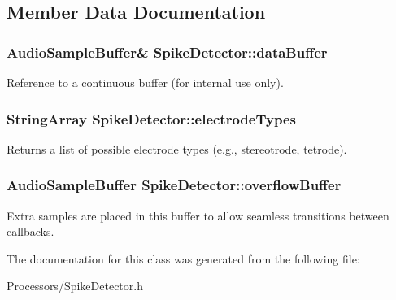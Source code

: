 \subsection{Member Data Documentation}
\hypertarget{classSpikeDetector_a050b87d647b7d12dd76e6e4fde9f932f}{
\subsubsection[{data\-Buffer}]{\setlength{\rightskip}{0pt plus 5cm}Audio\-Sample\-Buffer\& Spike\-Detector\-::data\-Buffer}}\label{classSpikeDetector_a050b87d647b7d12dd76e6e4fde9f932f}
Reference to a continuous buffer (for internal use only). \hypertarget{classSpikeDetector_a23eaf5359b4d13f75a16a28190014619}{
\subsubsection[{electrode\-Types}]{\setlength{\rightskip}{0pt plus 5cm}String\-Array Spike\-Detector\-::electrode\-Types}}\label{classSpikeDetector_a23eaf5359b4d13f75a16a28190014619}
Returns a list of possible electrode types (e.\-g., stereotrode, tetrode). \hypertarget{classSpikeDetector_a789328f70cc6f1de8f0b862189ce23bd}{
\subsubsection[{overflow\-Buffer}]{\setlength{\rightskip}{0pt plus 5cm}Audio\-Sample\-Buffer Spike\-Detector\-::overflow\-Buffer}}\label{classSpikeDetector_a789328f70cc6f1de8f0b862189ce23bd}
Extra samples are placed in this buffer to allow seamless transitions between callbacks. 

The documentation for this class was generated from the following file\-:\begin{DoxyCompactItemize}
\item 
Processors/Spike\-Detector.\-h\end{DoxyCompactItemize}
